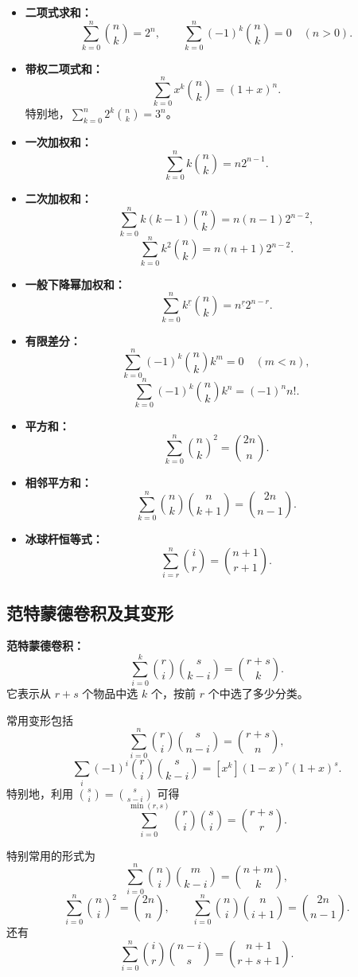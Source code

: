 \begin{itemize}
    \item \textbf{二项式求和：}
    \[
        \sum_{k=0}^{n}\binom{n}{k}=2^n,
        \qquad
        \sum_{k=0}^{n}(-1)^k\binom{n}{k}=0\quad(n>0).
    \]
    \item \textbf{带权二项式和：}
    \[
        \sum_{k=0}^{n}x^k\binom{n}{k}=(1+x)^n.
    \]
    特别地，$\sum_{k=0}^n2^k\binom{n}{k}=3^n$。
    \item \textbf{一次加权和：}
    \[
        \sum_{k=0}^{n}k\binom{n}{k}=n2^{n-1}.
    \]
    \item \textbf{二次加权和：}
    \[
        \sum_{k=0}^{n}k(k-1)\binom{n}{k}=n(n-1)2^{n-2},
    \]
    \[
        \sum_{k=0}^{n}k^2\binom{n}{k}=n(n+1)2^{n-2}.
    \]
    \item \textbf{一般下降幂加权和：}
    \[
        \sum_{k=0}^{n}k^{\underline r}\binom{n}{k}
        =n^{\underline r}2^{n-r}.
    \]
    \item \textbf{有限差分：}
    \[
        \sum_{k=0}^{n}(-1)^k\binom{n}{k}k^m=0\quad(m<n),
    \]
    \[
        \sum_{k=0}^{n}(-1)^k\binom{n}{k}k^n=(-1)^n n!.
    \]
    \item \textbf{平方和：}
    \[
        \sum_{k=0}^{n}\binom{n}{k}^2=\binom{2n}{n}.
    \]
    \item \textbf{相邻平方和：}
    \[
        \sum_{k=0}^{n}\binom{n}{k}\binom{n}{k+1}
        =\binom{2n}{n-1}.
    \]
    \item \textbf{冰球杆恒等式：}
    \[
        \sum_{i=r}^{n}\binom{i}{r}=\binom{n+1}{r+1}.
    \]
\end{itemize}

\subsection{范特蒙德卷积及其变形}

\textbf{范特蒙德卷积：}
\[
    \sum_{i=0}^{k}\binom{r}{i}\binom{s}{k-i}
    =\binom{r+s}{k}.
\]
它表示从 $r+s$ 个物品中选 $k$ 个，按前 $r$ 个中选了多少分类。

常用变形包括
\[
    \sum_{i=0}^{n}\binom{r}{i}\binom{s}{n-i}=\binom{r+s}{n},
\]
\[
    \sum_i(-1)^i\binom{r}{i}\binom{s}{k-i}
    =[x^k](1-x)^r(1+x)^s.
\]
特别地，利用 $\binom{s}{i}=\binom{s}{s-i}$ 可得
\[
    \sum_{i=0}^{\min(r,s)}\binom{r}{i}\binom{s}{i}
    =\binom{r+s}{r}.
\]

特别常用的形式为
\[
    \sum_{i=0}^{n}\binom{n}{i}\binom{m}{k-i}
    =\binom{n+m}{k},
\]
\[
    \sum_{i=0}^{n}\binom{n}{i}^2=\binom{2n}{n},
    \qquad
    \sum_{i=0}^{n}\binom{n}{i}\binom{n}{i+1}=\binom{2n}{n-1}.
\]
还有
\[
    \sum_{i=0}^{n}\binom{i}{r}\binom{n-i}{s}
    =\binom{n+1}{r+s+1}.
\]

